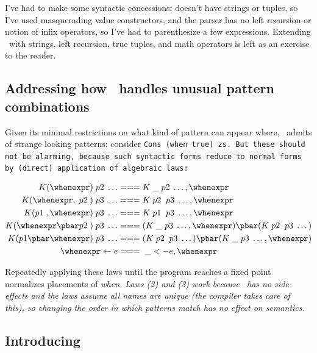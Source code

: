 \documentclass[manuscript,screen,review, 12pt, nonacm]{acmart}
\begin{document}
    I've had to make some syntactic concessions: \PPlus doesn't have strings or
    tuples, so I've used masquerading value constructors, and the parser has no
    left recursion or notion of infix operators, so I've had to parenthesize a
    few expressions. Extending \PPlus\ with strings, left recursion, true
    tuples, and math operators is left as an exercise to the reader. 
    
\subsection{Addressing how \PPlus\ handles unusual pattern combinations}
\label{ppweird}
    Given its minimal restrictions on what kind of pattern can appear where,
    \PPlus\ admits of strange looking patterns: consider \tt{Cons (when true)
    zs}. But these should not be alarming, because such syntactic forms reduce
    to normal forms by (direct) application of algebraic laws: 

    \begin{align}
      K (\whenexpr) \;p2\; \dots &=== K \;\_ \;p2\; \dots, \whenexpr \\
      K (\whenexpr, \;p2\;) \;p3\; \dots  &=== K \;p2\; \;p3\; \dots, \whenexpr \\
      K (p1\;, \whenexpr) \;p3\; \dots  &=== K \;p1\; \;p3\; \dots, \whenexpr \\
      K (\whenexpr \pbar p2\;) \;p3\; \dots &=== (K \;\_ \;p3\; \dots, \whenexpr) \pbar (K \;p2\; \;p3\; \dots) \\
      K (p1 \pbar \whenexpr) \;p3\; \dots &=== (K \;p2\; \;p3\; \dots) \pbar (K \;\_ \;p3\; \dots, \whenexpr)  \\
      \whenexpr \leftarrow e &=== \;\_ <- e, \whenexpr
    \end{align}
    
    
    Repeatedly applying these laws until the program reaches a fixed point
    normalizes placements of \it{when}. Laws (2) and (3) work because \PPlus\
    has no side effects and the laws assume all names are unique (the compiler
    takes care of this), so changing the order in which patterns match has no
    effect on semantics.         


\subsection{Introducing \VMinus\ }
\label{vminus}
\end{document}
